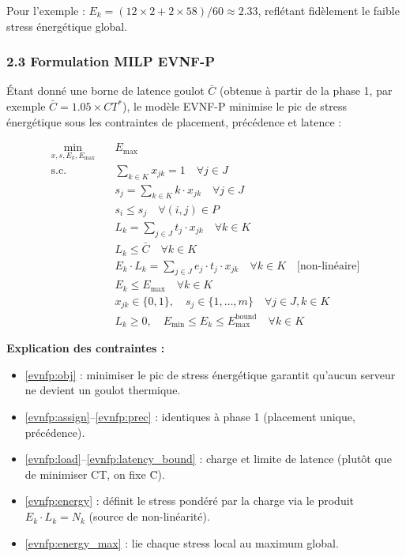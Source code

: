\documentclass{article}
\begin{document}
Pour l'exemple : $E_k = (12 \times 2 + 2 \times 58) / 60 \approx 2.33$, reflétant fidèlement le faible stress énergétique global.

\subsubsection{2.3 Formulation MILP EVNF-P}

Étant donné une borne de latence goulot $\bar{C}$ (obtenue à partir de la phase 1, par exemple $\bar{C} = 1.05 \times CT^*$), le modèle EVNF-P minimise le pic de stress énergétique sous les contraintes de placement, précédence et latence :

\begin{align}
\min_{x, s, E_k, E_{\max}} \quad & E_{\max} \label{evnfp:obj} \\
\text{s.c.} \quad & \sum_{k \in K} x_{jk} = 1 \quad \forall j \in J \label{evnfp:assign} \\
& s_j = \sum_{k \in K} k \cdot x_{jk} \quad \forall j \in J \label{evnfp:server_idx} \\
& s_i \le s_j \quad \forall (i, j) \in P \label{evnfp:prec} \\
& L_k = \sum_{j \in J} t_j \cdot x_{jk} \quad \forall k \in K \label{evnfp:load} \\
& L_k \le \bar{C} \quad \forall k \in K \label{evnfp:latency_bound} \\
& E_k \cdot L_k = \sum_{j \in J} e_j \cdot t_j \cdot x_{jk} \quad \forall k \in K \quad \text{[non-linéaire]} \label{evnfp:energy} \\
& E_k \le E_{\max} \quad \forall k \in K \label{evnfp:energy_max} \\
& x_{jk} \in \{0, 1\}, \quad s_j \in \{1, \ldots, m\} \quad \forall j \in J, k \in K \label{evnfp:bin} \\
& L_k \ge 0, \quad E_{\min} \le E_k \le E_{\max}^{\text{bound}} \quad \forall k \in K \label{evnfp:bounds}
\end{align}

\textbf{Explication des contraintes :}
\begin{itemize}
    \item \eqref{evnfp:obj} : minimiser le pic de stress énergétique garantit qu'aucun serveur ne devient un goulot thermique.
    \item \eqref{evnfp:assign}--\eqref{evnfp:prec} : identiques à phase 1 (placement unique, précédence).
    \item \eqref{evnfp:load}--\eqref{evnfp:latency_bound} : charge et limite de latence (plutôt que de minimiser CT, on fixe C̄).
    \item \eqref{evnfp:energy} : définit le stress pondéré par la charge via le produit $E_k \cdot L_k = N_k$ (source de non-linéarité).
    \item \eqref{evnfp:energy_max} : lie chaque stress local au maximum global.
\end{itemize}
\end{document}
